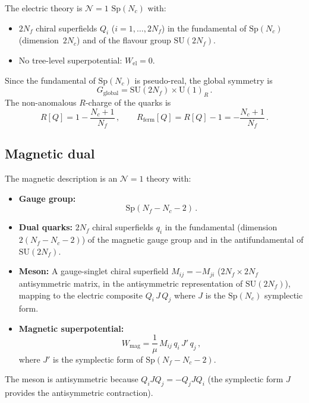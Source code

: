 \documentclass[11pt,a4paper]{article}
\theoremstyle{plain}
\theoremstyle{definition}
\theoremstyle{remark}
\newcommand{\Nc}{N_{\!c}}
\newcommand{\Nf}{N_{\!f}}
\newcommand{\SU}[1]{\mathrm{SU}(#1)}
\newcommand{\UU}[1]{\mathrm{U}(#1)}
\newcommand{\Sp}[1]{\mathrm{Sp}(#1)}
\begin{document}
The electric theory is $\mathcal{N}=1$ $\Sp{\Nc}$ with:
\begin{itemize}
  \item $2\Nf$ chiral superfields $Q_i$ ($i = 1, \ldots, 2\Nf$) in
    the fundamental of $\Sp{\Nc}$ (dimension~$2\Nc$) and of the flavour
    group $\SU{2\Nf}$.
  \item No tree-level superpotential: $W_{\mathrm{el}} = 0$.
\end{itemize}
Since the fundamental of $\Sp{\Nc}$ is pseudo-real, the global
symmetry is
\begin{equation}\label{eq:Sp-global}
  G_{\mathrm{global}} = \SU{2\Nf} \times \UU{1}_R\,.
\end{equation}
The non-anomalous $R$-charge of the quarks is
\begin{equation}\label{eq:Sp-R}
  R[Q] = 1 - \frac{\Nc + 1}{\Nf}\,,
  \qquad
  R_{\mathrm{ferm}}[Q] = R[Q] - 1 = -\frac{\Nc + 1}{\Nf}\,.
\end{equation}

\subsection{Magnetic dual}

The magnetic description is an $\mathcal{N}=1$ theory with:
\begin{itemize}
  \item \textbf{Gauge group:}
    \begin{equation}\label{eq:Sp-dual-gauge}
      \Sp{\Nf - \Nc - 2}\,.
    \end{equation}
  \item \textbf{Dual quarks:} $2\Nf$ chiral superfields $q_i$ in the
    fundamental (dimension $2(\Nf - \Nc - 2)$) of the magnetic gauge
    group and in the antifundamental of $\SU{2\Nf}$.
  \item \textbf{Meson:} A gauge-singlet chiral superfield
    $M_{ij} = -M_{ji}$ ($2\Nf \times 2\Nf$ antisymmetric matrix, in the
    antisymmetric representation of $\SU{2\Nf}$), mapping to the
    electric composite $Q_i\, J\, Q_j$ where $J$ is the $\Sp{\Nc}$
    symplectic form.
  \item \textbf{Magnetic superpotential:}
    \begin{equation}\label{eq:Sp-Wmag}
      W_{\mathrm{mag}} = \frac{1}{\mu}\, M_{ij}\, q_i\, J'\, q_j\,,
    \end{equation}
    where $J'$ is the symplectic form of $\Sp{\Nf - \Nc - 2}$.
\end{itemize}
The meson is antisymmetric because $Q_i J Q_j = -Q_j J Q_i$ (the
symplectic form $J$ provides the antisymmetric contraction).
\end{document}

